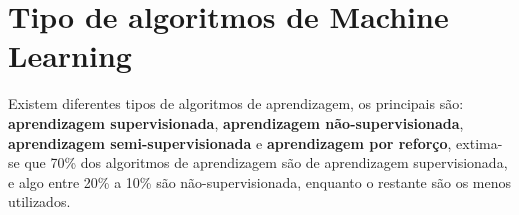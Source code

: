 \section{Tipo de algoritmos de Machine Learning}
\label{sec:ml-types}

Existem diferentes tipos de algoritmos de aprendizagem, os principais são: \textbf{aprendizagem supervisionada}, \textbf{aprendizagem não-supervisionada},
\textbf{aprendizagem semi-supervisionada} e \textbf{aprendizagem por reforço}, extima-se que 70\% dos algoritmos de aprendizagem são de 
aprendizagem supervisionada, e algo entre 20\% a 10\% são não-supervisionada, enquanto o restante são os menos utilizados.



